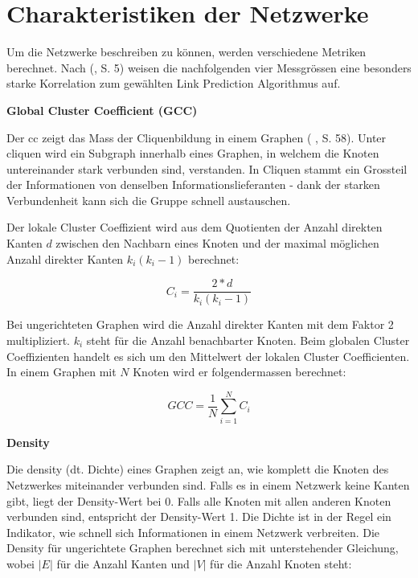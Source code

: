 \section{Charakteristiken der Netzwerke}
Um die Netzwerke beschreiben zu können, werden verschiedene Metriken berechnet.
Nach \citeauthor{gao_link_2015} (\citeyear{gao_link_2015}, S. 5) weisen die nachfolgenden vier Messgrössen eine besonders starke Korrelation zum gewählten Link Prediction Algorithmus auf.

\textbf{Global Cluster Coefficient (GCC)}

Der \acs{cc} zeigt das Mass der Cliquenbildung in einem Graphen (\citeauthor{michael_henninger_soziale_2018} \citeyear{michael_henninger_soziale_2018}, S. 58).
Unter \acs{clique}n wird ein Subgraph innerhalb eines Graphen, in welchem die Knoten untereinander stark verbunden sind, verstanden.
In Cliquen stammt ein Grossteil der Informationen von denselben Informationslieferanten - dank der starken Verbundenheit kann sich die Gruppe schnell austauschen.

Der lokale Cluster Coeffizient wird aus dem Quotienten der Anzahl direkten Kanten $d$ zwischen den Nachbarn eines Knoten und der maximal möglichen Anzahl direkter Kanten $k_i(k_i -1)$ berechnet:

\begin{equation}
    \label{eq:ci}
    C_i = \frac{2*d}{k_i(k_i-1)}
\end{equation}


Bei ungerichteten Graphen wird die Anzahl direkter Kanten mit dem Faktor 2 multipliziert. $k_i$ steht für die Anzahl benachbarter Knoten.
Beim globalen Cluster Coeffizienten handelt es sich um den Mittelwert der lokalen Cluster Coefficienten.
In einem Graphen mit $N$ Knoten wird er folgendermassen berechnet:

\begin{equation}
    \label{eq:gcc}
    GCC = \frac{1}{N}\sum\limits_{i=1}^{N}C_i
\end{equation}

\textbf{Density}

Die \acs{density} (dt. Dichte) eines Graphen zeigt an, wie komplett die Knoten des Netzwerkes miteinander verbunden sind.
Falls es in einem Netzwerk keine Kanten gibt, liegt der Density-Wert bei 0. Falls alle Knoten mit allen anderen Knoten verbunden sind, entspricht der Density-Wert 1.
Die Dichte ist in der Regel ein Indikator, wie schnell sich Informationen in einem Netzwerk verbreiten.
Die Density für ungerichtete Graphen berechnet sich mit unterstehender Gleichung, wobei $|E|$ für die Anzahl Kanten und $|V|$ für die Anzahl Knoten steht:

